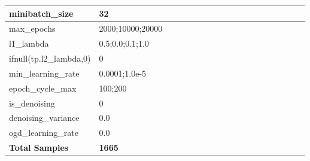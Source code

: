 \documentclass[a4paper,11pt,oneside]{article}
\theoremstyle{plain}
\theoremstyle{definition}
\begin{document}
\begin{longtable}[H]{|p{0.3\linewidth}|p{0.7\linewidth}|}
		{minibatch\_size} & {32} \\\hline
		{max\_epochs} & {2000;10000;20000} \\\hline
		{l1\_lambda} & {0.5;0.0;0.1;1.0} \\\hline
		{ifnull(tp.l2\_lambda,0)} & {0} \\\hline
		{min\_learning\_rate} & {0.0001;1.0e-5} \\\hline
		{epoch\_cycle\_max} & {100;200} \\\hline
		{is\_denoising} & {0} \\\hline
		{denoising\_variance} & {0.0} \\\hline
		{ogd\_learning\_rate} & {0.0} \\\hline
		{\textbf{Total Samples}} & {\textbf{1665}} \\\hline
	\end{longtable}
	
	\newpage
\end{document}
